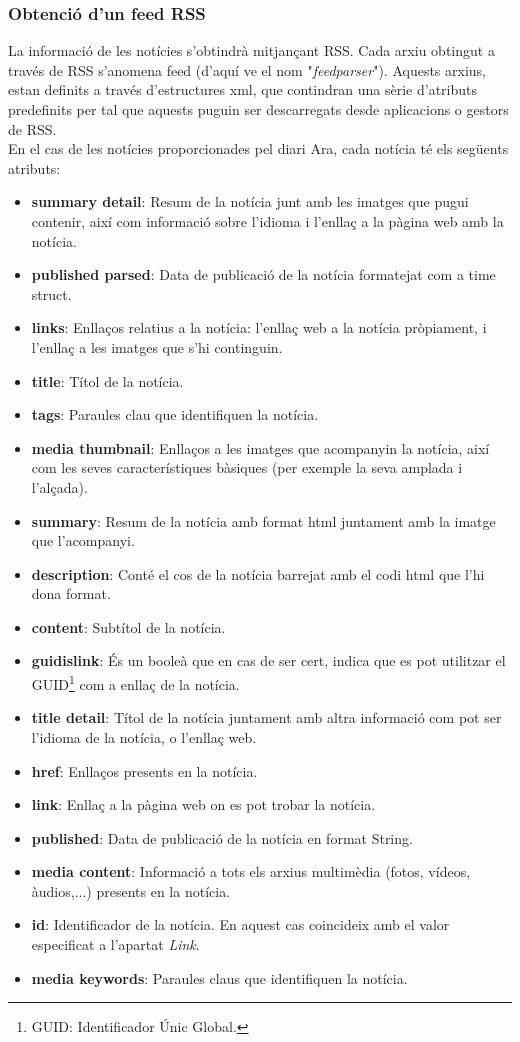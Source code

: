 \documentclass[12pt,a4paper,openright,oneside]{article}
\numberwithin{equation}{section}
\theoremstyle{definition}
\begin{document}
\subsubsection*{Obtenció d'un feed RSS}
La informació de les notícies s'obtindrà mitjançant RSS. Cada arxiu obtingut a través de RSS s'anomena feed (d'aquí ve el nom "\emph{feedparser}")\cite{feedparser}. Aquests arxius, estan definits a través d'estructures xml, que contindran una sèrie d'atributs predefinits per tal que aquests puguin ser descarregats desde aplicacions o gestors de RSS.\\
En el cas de les notícies proporcionades pel diari Ara, cada notícia té els següents atributs:

\begin{itemize}
\item \textbf{summary detail}: Resum de la notícia junt amb les imatges que pugui contenir, així com informació sobre l'idioma i l'enllaç a la pàgina web amb la notícia.
\item \textbf{published parsed}: Data de publicació de la notícia formatejat com a time struct.
\item \textbf{links}: Enllaços relatius a la notícia: l'enllaç web a la notícia pròpiament, i l'enllaç a les imatges que s'hi continguin. 
\item \textbf{title}: Títol de la notícia.
\item \textbf{tags}: Paraules clau que identifiquen la notícia.
\item \textbf{media thumbnail}: Enllaços a les imatges que acompanyin la notícia, així com les seves característiques bàsiques (per exemple la seva amplada i l'alçada).
\item \textbf{summary}: Resum de la notícia amb format html juntament amb la imatge que l'acompanyi.
\item \textbf{description}: Conté el cos de la notícia barrejat amb el codi html que l'hi dona format.
\item \textbf{content}: Subtítol de la notícia.
\item \textbf{guidislink}: És un booleà que en cas de ser cert, indica que es pot utilitzar el GUID\footnote{GUID: Identificador Únic Global.} com a enllaç de la notícia.
\item \textbf{title detail}: Títol de la notícia juntament amb altra informació com pot ser l'idioma de la notícia, o l'enllaç web.
\item \textbf{href}: Enllaços presents en la notícia.
\item \textbf{link}: Enllaç a la pàgina web on es pot trobar la notícia.
\item \textbf{published}: Data de publicació de la notícia en format String.
\item \textbf{media content}: Informació a tots els arxius multimèdia (fotos, vídeos, àudios,...) presents en la notícia.
\item \textbf{id}: Identificador de la notícia. En aquest cas coincideix amb el valor especificat a l'apartat \emph{Link}.
\item \textbf{media keywords}: Paraules claus que identifiquen la notícia.
\end{itemize}
\end{document}
